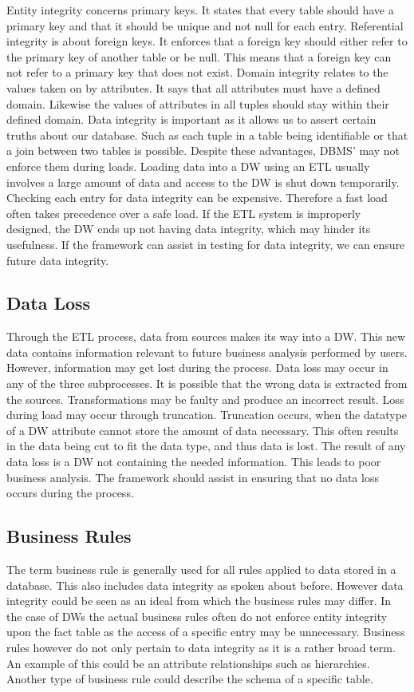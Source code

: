 Entity integrity concerns primary keys. It states that every table should have a primary key and that it should be unique and not null for each entry. Referential integrity is about foreign keys. It enforces that a foreign key should either refer to the primary key of another table or be null. This means that a foreign key can not refer to a primary key that does not exist.  Domain integrity relates to the values taken on by attributes. It says that all attributes must have a defined domain. Likewise the values of attributes in all tuples should stay within their defined domain. Data integrity is important as it allows us to assert certain truths about our database. Such as each tuple in a table being identifiable or that a join between two tables is possible. Despite these advantages, DBMS' may not enforce them during loads. Loading data into a DW using an ETL usually involves a large amount of data and access to the DW is shut down temporarily. Checking each entry for data integrity can be expensive. Therefore a fast load often takes precedence over a safe load. If the ETL system is improperly designed, the DW ends up not having data integrity, which may hinder its usefulness. If the framework can assist in testing for data integrity, we can ensure future data integrity.

\subsection{Data Loss}
Through the ETL process, data from sources makes its way into a DW. This new data contains information relevant to future business analysis performed by users. However, information may get lost during the process. Data loss may occur in any of the three subprocesses. It is possible that the wrong data is extracted from the sources. Transformations may be faulty and produce an incorrect result. Loss during load may occur  through truncation. Truncation occurs, when the datatype of a DW attribute cannot store the amount of data necessary. This often results in the data being cut to fit the data type, and thus data is lost.  The result of any data loss is a DW not containing the needed information. This leads to poor business analysis. The framework should assist in ensuring that no data loss occurs during the process.

\subsection{Business Rules}
The term business rule is generally used for all rules applied to data stored in a database. This also includes data integrity as spoken about before. However data integrity could be seen as an ideal from which the business rules may differ. In the case of DWs the actual business rules often do not enforce entity integrity upon the fact table as the access of a specific entry may be unnecessary. Business rules however do not only pertain to data integrity as it is a rather broad term. An example of this could be an attribute relationships such as hierarchies. Another type of business rule could describe the schema of a specific table.

